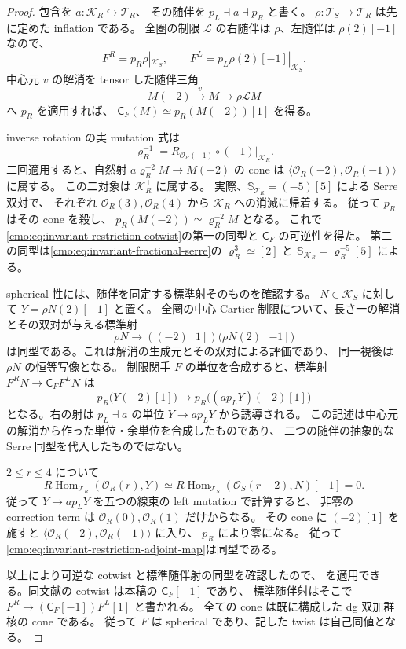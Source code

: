 \begin{proof}
包含を $a:\mathcal K_R\hookrightarrow\mathcal T_R$、
その随伴を $p_L\dashv a\dashv p_R$ と書く。
$\rho:\mathcal T_S\to\mathcal T_R$ は先に定めた inflation である。
全圏の制限 $\mathcal L$ の右随伴は $\rho$、左随伴は $\rho(2)[-1]$ なので、
\[
 F^R=p_R\rho|_{\mathcal K_S},\qquad
 F^L=p_L\rho(2)[-1]|_{\mathcal K_S}.
\]
中心元 $v$ の解消を tensor した随伴三角
\[
 M(-2)\xrightarrow{v}M\longrightarrow\rho\mathcal L M
\]
へ $p_R$ を適用すれば、
$\mathsf C_F(M)\simeq p_R(M(-2))[1]$ を得る。

inverse rotation の実 mutation 式は
\[
 \varrho_R^{-1}=R_{\mathcal O_R(-1)}\circ(-1)|_{\mathcal K_R}.
\]
二回適用すると、自然射
$a\varrho_R^{-2}M\to M(-2)$ の cone は
$\langle\mathcal O_R(-2),\mathcal O_R(-1)\rangle$ に属する。
この二対象は $\mathcal K_R^\perp$ に属する。
実際、$\mathbb S_{\mathcal T_R}=(-5)[5]$ による Serre 双対で、
それぞれ $\mathcal O_R(3),\mathcal O_R(4)$ から $\mathcal K_R$ への消滅に帰着する。
従って $p_R$ はその cone を殺し、
$p_R(M(-2))\simeq\varrho_R^{-2}M$ となる。
これで\eqref{cmo:eq:invariant-restriction-cotwist}の第一の同型と
$\mathsf C_F$ の可逆性を得た。
第二の同型は\eqref{cmo:eq:invariant-fractional-serre}の
$\varrho_R^3\simeq[2]$ と
$\mathbb S_{\mathcal K_R}=\varrho_R^{-5}[5]$ による。

spherical 性には、随伴を同定する標準射そのものを確認する。
$N\in\mathcal K_S$ に対して $Y=\rho N(2)[-1]$ と置く。
全圏の中心 Cartier 制限について、長さ一の解消とその双対が与える標準射
\[
 \rho N\longrightarrow ((-2)[1])\bigl(\rho N(2)[-1]\bigr)
\]
は同型である。これは解消の生成元とその双対による評価であり、
同一視後は $\rho N$ の恒等写像となる。
制限関手 $F$ の単位を合成すると、標準射
$F^R N\to\mathsf C_F F^L N$ は
\begin{equation}
\label{cmo:eq:invariant-restriction-adjoint-map}
 p_R\bigl(Y(-2)[1]\bigr)
 \longrightarrow p_R\bigl((a p_LY)(-2)[1]\bigr)
\end{equation}
となる。右の射は $p_L\dashv a$ の単位 $Y\to a p_LY$ から誘導される。
この記述は中心元の解消から作った単位・余単位を合成したものであり、
二つの随伴の抽象的な Serre 同型を代入したものではない。

$2\le r\le4$ について
\[
 R\operatorname{Hom}_{\mathcal T_R}(\mathcal O_R(r),Y)
 \simeq R\operatorname{Hom}_{\mathcal T_S}(\mathcal O_S(r-2),N)[-1]=0.
\]
従って $Y\to a p_LY$ を五つの線束の left mutation で計算すると、
非零の correction term は $\mathcal O_R(0),\mathcal O_R(1)$ だけからなる。
その cone に $(-2)[1]$ を施すと
$\langle\mathcal O_R(-2),\mathcal O_R(-1)\rangle$ に入り、
$p_R$ により零になる。
従って\eqref{cmo:eq:invariant-restriction-adjoint-map}は同型である。

以上により可逆な cotwist と標準随伴射の同型を確認したので、
\cite[Theorem~5.1, conditions~(2) and~(4)]{CMOAnnoLogvinenkoSpherical}
を適用できる。同文献の cotwist は本稿の $\mathsf C_F[-1]$ であり、
標準随伴射はそこで $F^R\to(\mathsf C_F[-1])F^L[1]$ と書かれる。
全ての cone は既に構成した dg 双加群核の cone である。
従って $F$ は spherical であり、記した twist は自己同値となる。
\end{proof}

